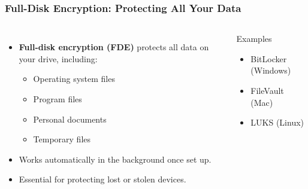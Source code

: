 \documentclass{beamer}
\begin{document}
\begin{frame}
    \frametitle{Full-Disk Encryption: Protecting All Your Data}
    
    \begin{columns}[t]
            \begin{itemize}
                \item \textbf{Full-disk encryption (FDE)} protects all data on your drive, including:
                    \begin{itemize}
                        \item Operating system files
                        \item Program files
                        \item Personal documents
                        \item Temporary files
                    \end{itemize}
                
                \item Works automatically in the background once set up.
                
                \item Essential for protecting lost or stolen devices.
            \end{itemize}
        
            \begin{alertblock}{Examples}
                \begin{itemize}
                    \item BitLocker (Windows)
                    \item FileVault (Mac)
                    \item LUKS (Linux)
                \end{itemize}
            \end{alertblock}
    \end{columns}
\end{frame}
\end{document}
